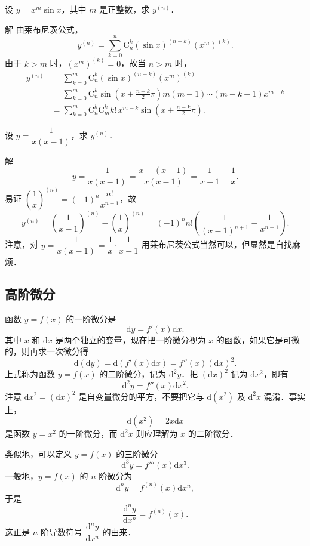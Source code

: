 \begin{example}\label{ex:4-4-5}
设 $y=x^{m}\sin x$，其中 $m$ 是正整数，求 $y^{(n)}$．

解 由莱布尼茨公式，
\[
y^{(n)}=\sum_{k=0}^{n}\mathrm{C}_{n}^{k}\left(\sin x\right)^{(n-k)}\left(x^{m}\right)^{(k)}.
\]
由于 $k>m$ 时，$(x^{m})^{(k)}=0$，故当 $n>m$ 时，
\[
\begin{aligned}
y^{(n)}&=\sum_{k=0}^{m}\mathrm{C}_{n}^{k}\left(\sin x\right)^{(n-k)}\left(x^{m}\right)^{(k)}\\
&=\sum_{k=0}^{m}\mathrm{C}_{n}^{k}\sin\left(x+\frac{n-k}{2}\pi\right)m(m-1)\cdots(m-k+1)x^{m-k}\\
&=\sum_{k=0}^{m}\mathrm{C}_{n}^{k}\mathrm{C}_{m}^{k}k!\,x^{m-k}\sin\left(x+\frac{n-k}{2}\pi\right).
\end{aligned}
\]
\end{example}

\begin{example}\label{ex:4-4-6}
设 $y=\dfrac{1}{x(x-1)}$，求 $y^{(n)}$．

解
\[
y=\frac{1}{x(x-1)}=\frac{x-(x-1)}{x(x-1)}=\frac{1}{x-1}-\frac{1}{x}.
\]
易证 $\left(\dfrac{1}{x}\right)^{(n)}=(-1)^{n}\dfrac{n!}{x^{n+1}}$，故
\[
y^{(n)}=\left(\frac{1}{x-1}\right)^{(n)}-\left(\frac{1}{x}\right)^{(n)}=(-1)^{n}n!\left(\frac{1}{(x-1)^{n+1}}-\frac{1}{x^{n+1}}\right).
\]
注意，对 $y=\dfrac{1}{x(x-1)}=\dfrac{1}{x}\cdot\dfrac{1}{x-1}$ 用莱布尼茨公式当然可以，但显然是自找麻烦．
\end{example}

\subsection{高阶微分}

函数 $y=f(x)$ 的一阶微分是
\[
\mathrm{d}y=f'(x)\mathrm{d}x.
\]
其中 $x$ 和 $\mathrm{d}x$ 是两个独立的变量，现在把一阶微分视为 $x$ 的函数，如果它是可微的，则再求一次微分得
\[
\mathrm{d}(\mathrm{d}y)=\mathrm{d}(f'(x)\mathrm{d}x)=f''(x)(\mathrm{d}x)^{2}.
\]
上式称为函数 $y=f(x)$ 的二阶微分，记为 $\mathrm{d}^{2}y$．把 $(\mathrm{d}x)^{2}$ 记为 $\mathrm{d}x^{2}$，即有
\[
\mathrm{d}^{2}y=f''(x)\mathrm{d}x^{2}.
\]
注意 $\mathrm{d}x^{2}=(\mathrm{d}x)^{2}$ 是自变量微分的平方，不要把它与 $\mathrm{d}(x^{2})$ 及 $\mathrm{d}^{2}x$ 混淆．事实上，
\[
\mathrm{d}(x^{2})=2x\mathrm{d}x
\]
是函数 $y=x^{2}$ 的一阶微分，而 $\mathrm{d}^{2}x$ 则应理解为 $x$ 的二阶微分．

类似地，可以定义 $y=f(x)$ 的三阶微分
\[
\mathrm{d}^{3}y=f'''(x)\mathrm{d}x^{3}.
\]
一般地，$y=f(x)$ 的 $n$ 阶微分为
\[
\mathrm{d}^{n}y=f^{(n)}(x)\mathrm{d}x^{n},
\]
于是
\[
\frac{\mathrm{d}^{n}y}{\mathrm{d}x^{n}}=f^{(n)}(x).
\]
这正是 $n$ 阶导数符号 $\dfrac{\mathrm{d}^{n}y}{\mathrm{d}x^{n}}$ 的由来．

